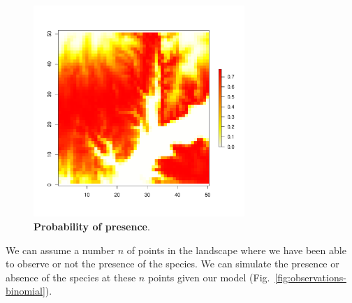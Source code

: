 \documentclass[a4paper, 12pt, leqno]{article}\usepackage[]{graphicx}\usepackage[]{color}
\begin{document}
\begin{figure}[!h] 
  \centering \includegraphics[width=8cm]{figures/theta-binomial.pdf}
  \caption{\textbf{Probability of presence}.}
  \label{fig:theta-binomial}
\end{figure}

We can assume a number $n$ of points in the landscape where we have been able to observe
or not the presence of the species. We can simulate the presence or absence of the species
at these $n$ points given our model (Fig.~\ref{fig:observations-binomial}).
\end{document}
